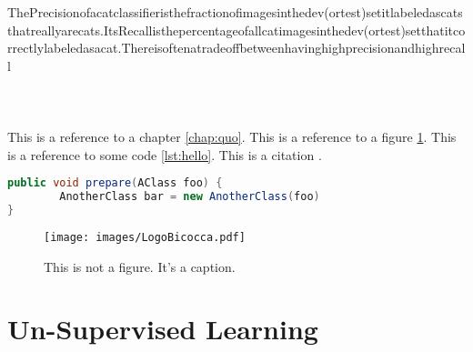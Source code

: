  ThePrecisionofacatclassifieristhefractionofimagesinthedev(ortest)setitlabeledascatsthatreallyarecats.ItsRecallisthepercentageofallcatimagesinthedev(ortest)setthatitcorrectlylabeledasacat.Thereisoftenatradeoffbetweenhavinghighprecisionandhighrecall
 \\
 \\
 \\
 \\



This is a reference to a chapter \ref{chap:quo}. This is a reference to a figure \ref{fig:doge}. This is a reference to some code \ref{lst:hello}. This is a citation \cite{famous:paper}.



\begin{lstlisting}[language=Java, label=lst:java, caption={Some code in another language than the default one}]
public void prepare(AClass foo) {
        AnotherClass bar = new AnotherClass(foo)
}
\end{lstlisting}

\Blindtext

\begin{figure}
\begin{center}
\texttt{[image: images/LogoBicocca.pdf]}
\end{center}
\caption{This is not a figure. It's a caption.}
\label{fig:doge}
\end{figure}

\section{Un-Supervised Learning}
